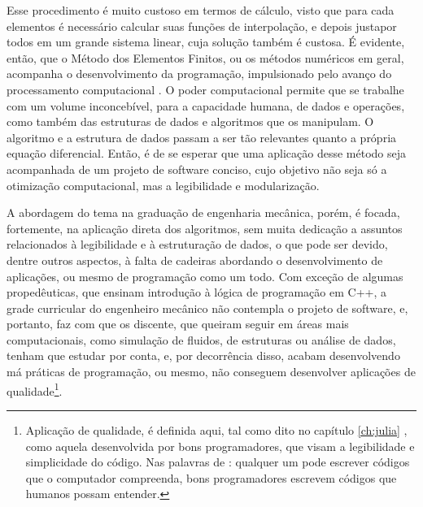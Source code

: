 Esse procedimento é muito custoso em termos de cálculo, visto que para cada elementos é necessário calcular suas funções de interpolação, e depois justapor todos em um grande sistema linear, cuja solução também é custosa. É evidente, então, que o Método dos Elementos Finitos, ou os métodos numéricos em geral, acompanha o desenvolvimento da programação, impulsionado pelo avanço do processamento computacional \cite{Onate}. O poder computacional permite que se trabalhe com um volume inconcebível, para a capacidade humana, de dados e operações, como também das estruturas de dados e algoritmos que os manipulam. O algoritmo e a estrutura de dados passam a ser tão relevantes quanto a própria equação diferencial. Então, é de se esperar que uma aplicação desse método seja acompanhada de um projeto de software conciso, cujo objetivo não seja só a otimização computacional, mas a legibilidade e modularização.

A abordagem do tema na graduação de engenharia mecânica, porém, é focada, fortemente, na aplicação direta dos algoritmos, sem muita dedicação a assuntos relacionados à legibilidade e à estruturação de dados, o que pode ser devido, dentre outros aspectos, à falta de cadeiras abordando o desenvolvimento de aplicações, ou mesmo de programação como um todo. Com exceção de algumas propedêuticas, que ensinam introdução à lógica de programação em C++, a grade curricular do engenheiro mecânico não contempla o projeto de software, e, portanto, faz com que os discente, que queiram seguir em áreas mais computacionais, como simulação de fluidos, de estruturas ou análise de dados, tenham que estudar por conta, e, por decorrência disso, acabam desenvolvendo má práticas de programação, ou mesmo, não conseguem desenvolver aplicações de qualidade\footnote{Aplicação de qualidade, é definida aqui, tal como dito no capítulo \ref{ch:julia} , como aquela desenvolvida por bons programadores, que visam a legibilidade e simplicidade do código. Nas palavras de : qualquer um pode escrever códigos que o computador compreenda, bons programadores escrevem códigos que humanos possam entender.}. 

